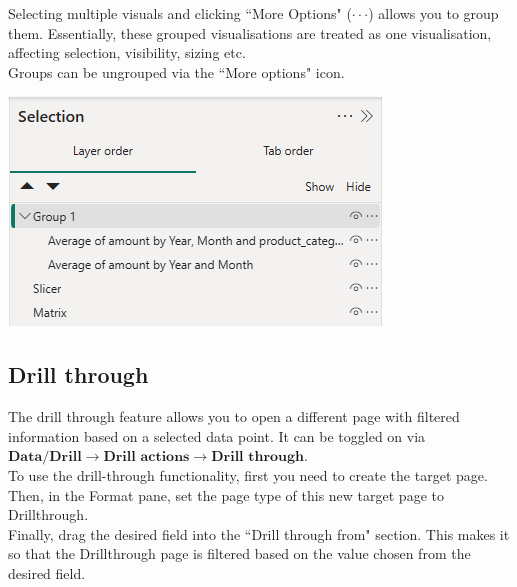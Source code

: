 \documentclass[10pt, openany, twocolumn]{book}
\begin{document}
Selecting multiple visuals and clicking ``More Options" ($\cdot \cdot \cdot$) allows you to group them. Essentially, these grouped visualisations are treated as one visualisation, affecting selection, visibility, sizing etc. \\

Groups can be ungrouped via the ``More options" icon.

\begin{center}
    \includegraphics[width=0.95\columnwidth]{images/selection_group.png}
\end{center}

\subsection*{Drill through}

The drill through feature allows you to open a different page with filtered information based on a selected data point. It can be toggled on via\\

$\textbf{Data/Drill} \rightarrow \textbf{Drill actions} \rightarrow \textbf{Drill through}$.\\

To use the drill-through functionality, first you need to create the target page. \\
Then, in the Format pane, set the page type of this new target page to Drillthrough. \\
Finally, drag the desired field into the ``Drill through from" section. This makes it so that the Drillthrough page is filtered based on the value chosen from the desired field.
\end{document}
